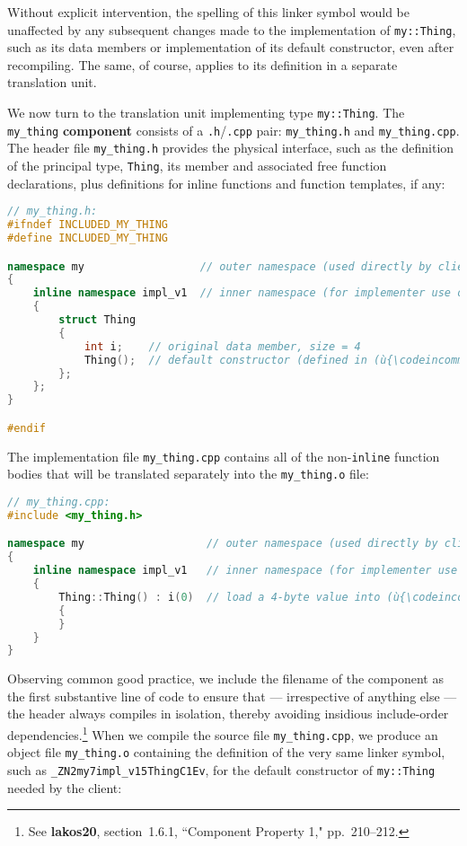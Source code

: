 \noindent Without explicit intervention, the spelling of this linker symbol would
be unaffected by any subsequent changes made to the implementation of
\texttt{my::Thing}, such as its data members or implementation of its
default constructor, even after recompiling. The same, of course,
applies to its definition in a separate translation unit.

We now turn to the translation unit implementing type
\texttt{my::Thing}. The \texttt{my\_thing} \textbf{component} consists
of a \texttt{.h}/\texttt{.cpp} pair: \texttt{my\_thing.h} and
\texttt{my\_thing.cpp}. The header file \texttt{my\_thing.h} provides
the physical interface, such as the definition of the principal type,
\texttt{Thing}, its member and associated free function declarations,
plus definitions for inline functions and function templates, if any:

\begin{lstlisting}[language=C++]
// my_thing.h:
#ifndef INCLUDED_MY_THING
#define INCLUDED_MY_THING

namespace my                  // outer namespace (used directly by clients)
{
    inline namespace impl_v1  // inner namespace (for implementer use only)
    {
        struct Thing
        {
            int i;    // original data member, size = 4
            Thing();  // default constructor (defined in (ù{\codeincomments{my\_thing.cpp}}ù))
        };
    };
}

#endif
\end{lstlisting}

\noindent The implementation file \texttt{my\_thing.cpp} contains all of the
non-\texttt{inline} function bodies that will be translated separately
into the \texttt{my\_thing.o} file:

\begin{lstlisting}[language=C++]
// my_thing.cpp:
#include <my_thing.h>

namespace my                   // outer namespace (used directly by clients)
{
    inline namespace impl_v1   // inner namespace (for implementer use only)
    {
        Thing::Thing() : i(0)  // load a 4-byte value into (ù{\codeincomments{Thing}}ù)'s data member
        {
        }
    }
}
\end{lstlisting}

\noindent Observing common good practice, we include the filename of the component
as the first substantive line of code to ensure that --- irrespective of
anything else --- the header always compiles in isolation, thereby
avoiding insidious include-order dependencies.{\cprotect\footnote{See
  \textbf{{lakos20}}, section~1.6.1, ``Component Property 1," pp.~210--212.}} When we compile the source file \texttt{my\_thing.cpp},
we produce an object file \texttt{my\_thing.o} containing the definition
of the very same linker symbol, such as
\texttt{\_ZN2my7impl\_v15ThingC1Ev}, for the default constructor of
\texttt{my::Thing} needed by the client:

